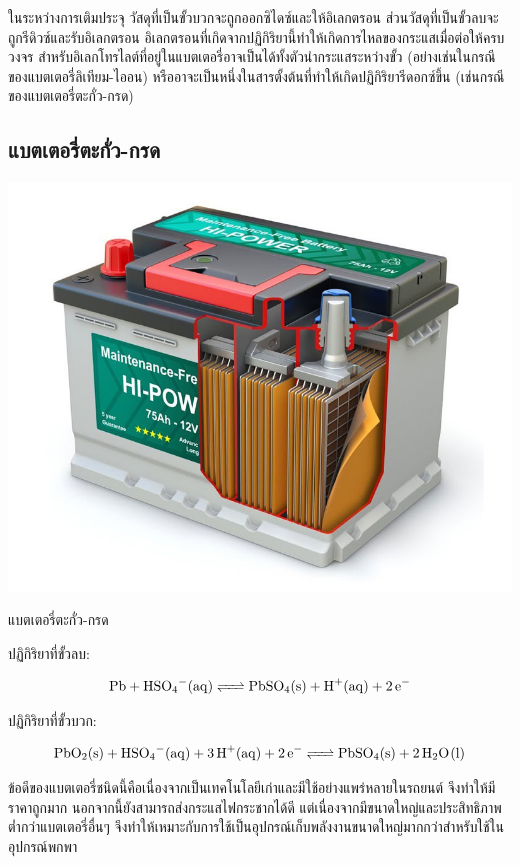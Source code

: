 \documentclass[a4paper,nobib,openany,10pt]{tufte-book}
\begin{document}
ในระหว่างการเติมประจุ วัสดุที่เป็นขั้วบวกจะถูกออกซิไดซ์และให้อิเลกตรอน ส่วนวัสดุที่เป็นขั้วลบจะถูกรีดิวซ์และรับอิเลกตรอน อิเลกตรอนที่เกิดจากปฏิกิริยานี้ทำให้เกิดการไหลของกระแสเมื่อต่อให้ครบวงจร สำหรับอิเลกโทรไลต์ที่อยู่ในแบตเตอรี่อาจเป็นได้ทั้งตัวนำกระแสระหว่างขั้ว (อย่างเช่นในกรณีของแบตเตอรี่ลิเทียม-ไออน) หรืออาจะเป็นหนึ่งในสารตั้งต้นที่ทำให้เกิดปฏิกิริยารีดอกซ์ขึ้น (เช่นกรณีของแบตเตอรี่ตะกั่ว-กรด)

\subsection{แบตเตอรี่ตะกั่ว-กรด}
\label{sec:org5ee6a4c}

\begin{marginfigure}
  \centering
  \includegraphics[width=\textwidth]{pictures/lead-acid-battery}
\caption{แบตเตอรี่ตะกั่ว-กรด}
\end{marginfigure}

ปฏิกิริยาที่ขั้วลบ:

$$ \ce{Pb + HSO4^-(aq) <=> PbSO4(s) + H^+(aq) + 2e^-} $$

ปฏิกิริยาที่ขั้วบวก:

$$ \ce{PbO2(s) + HSO4^-(aq) + 3H^+(aq) + 2e^- <=> PbSO4(s) + 2H2O(l)} $$

ข้อดีของแบตเตอรี่ชนิดนี้คือเนื่องจากเป็นเทคโนโลยีเก่าและมีใช้อย่างแพร่หลายในรถยนต์ จึงทำให้มีราคาถูกมาก นอกจากนี้ยังสามารถส่งกระแสไฟกระชากได้ดี แต่เนื่องจากมีขนาดใหญ่และประสิทธิภาพต่ำกว่าแบตเตอรี่อื่นๆ จึงทำให้เหมาะกับการใช้เป็นอุปกรณ์เก็บพลังงานขนาดใหญ่มากกว่าสำหรับใช้ในอุปกรณ์พกพา
\end{document}
